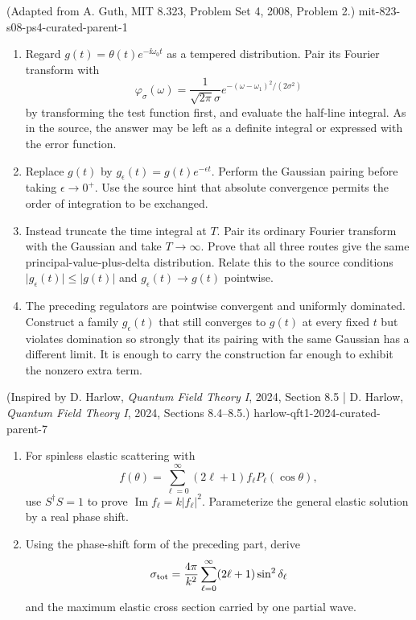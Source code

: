 \begin{enumerate}
  {(Adapted from A. Guth, MIT 8.323, Problem Set 4, 2008, Problem 2.)}
  {mit-823-s08-ps4-curated-parent-1}
\begin{enumerate}
\item Regard \(g(t)=\theta(t)e^{-\ii\omega_0t}\) as a tempered
distribution.  Pair its Fourier transform with
\[
 \varphi_\sigma(\omega)=\frac{1}{\sqrt{2\pi}\sigma}
 e^{-(\omega-\omega_1)^2/(2\sigma^2)}
\]
by transforming the test function first, and evaluate the half-line
integral.  As in the source, the answer may be left as a definite
integral or expressed with the error function.
\item Replace \(g(t)\) by \(g_\epsilon(t)=g(t)e^{-\epsilon t}\).
Perform the Gaussian pairing before taking \(\epsilon\to0^+\).  Use the
source hint that absolute convergence permits the order of integration to
be exchanged.
\item Instead truncate the time integral at \(T\).  Pair its ordinary
Fourier transform with the Gaussian and take \(T\to\infty\).  Prove
that all three routes give the same principal-value-plus-delta
distribution.  Relate this to the source conditions
\(\lvert g_\epsilon(t)\rvert\leq\lvert g(t)\rvert\) and
\(g_\epsilon(t)\to g(t)\) pointwise.
\item The preceding regulators are pointwise convergent and uniformly
dominated.  Construct a family \(g_\epsilon(t)\) that still converges to
\(g(t)\) at every fixed \(t\) but violates domination so strongly that
its pairing with the same Gaussian has a different limit.  It is enough
to carry the construction far enough to exhibit the nonzero extra term.
\end{enumerate}

  {(Inspired by D. Harlow, \emph{Quantum Field Theory I}, 2024, Section 8.5 | D. Harlow, \emph{Quantum Field Theory I}, 2024, Sections 8.4--8.5.)}
  {harlow-qft1-2024-curated-parent-7}
\begin{enumerate}
\item
For spinless elastic scattering with
\[
 f(\theta)=\sum_{\ell=0}^\infty(2\ell+1)f_\ell P_\ell(\cos\theta),
\]
use \(S^\dagger S=1\) to prove
\(\operatorname{Im}f_\ell=k|f_\ell|^2\).  Parameterize the general
elastic solution by a real phase shift.
\item
Using the phase-shift form of the preceding part, derive
\[
 \sigma_{\rm tot}=\frac{4\pi}{k^2}
 \sum_{\ell=0}^\infty(2\ell+1)\sin^2\delta_\ell
\]
and the maximum elastic cross section carried by one partial wave.
\end{enumerate}


\end{enumerate}
